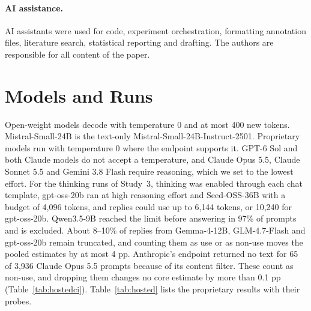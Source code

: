 \documentclass[11pt]{article}
\renewcommand{\topfraction}{0.9}\renewcommand{\bottomfraction}{0.6}\renewcommand{\textfraction}{0.08}
\renewcommand{\floatpagefraction}{0.75}\renewcommand{\dbltopfraction}{0.9}\renewcommand{\dblfloatpagefraction}{0.75}
\begin{document}
\paragraph{AI assistance.} AI assistants were used for code, experiment orchestration, formatting annotation files, literature search, statistical reporting and drafting. The authors are responsible for all content of the paper.



\appendix
\raggedbottom
\setcounter{topnumber}{4}\setcounter{bottomnumber}{3}\setcounter{totalnumber}{6}\setcounter{dbltopnumber}{4}
\renewcommand{\topfraction}{0.95}\renewcommand{\bottomfraction}{0.9}\renewcommand{\textfraction}{0.05}\renewcommand{\floatpagefraction}{0.6}
\renewcommand{\dbltopfraction}{0.95}\renewcommand{\dblfloatpagefraction}{0.6}
\makeatletter\setlength{\@fptop}{0pt}\setlength{\@fpsep}{10pt}\setlength{\@fpbot}{0pt plus 1fil}\setlength{\@dblfptop}{0pt}\setlength{\@dblfpsep}{14pt}\setlength{\@dblfpbot}{0pt plus 1fil}\makeatother
\section{Models and Runs}
\label{app:models}
Open-weight models decode with temperature 0 and at most 400 new tokens. Mistral-Small-24B is the text-only Mistral-Small-24B-Instruct-2501. Proprietary models run with temperature 0 where the endpoint supports it. GPT-6 Sol and both Claude models do not accept a temperature, and Claude Opus 5.5, Claude Sonnet 5.5 and Gemini 3.8 Flash require reasoning, which we set to the lowest effort. For the thinking runs of Study~3, thinking was enabled through each chat template, gpt-oss-20b ran at high reasoning effort and Seed-OSS-36B with a budget of 4,096 tokens, and replies could use up to 6,144 tokens, or 10,240 for gpt-oss-20b. Qwen3.5-9B reached the limit before answering in 97\% of prompts and is excluded. About 8--10\% of replies from Gemma-4-12B, GLM-4.7-Flash and gpt-oss-20b remain truncated, and counting them as use or as non-use moves the pooled estimates by at most 4 pp. Anthropic's endpoint returned no text for 65 of 3,936 Claude Opus 5.5 prompts because of its content filter. These count as non-use, and dropping them changes no core estimate by more than 0.1 pp (Table~\ref{tab:hostedci}). Table~\ref{tab:hosted} lists the proprietary results with their probes.
\end{document}
